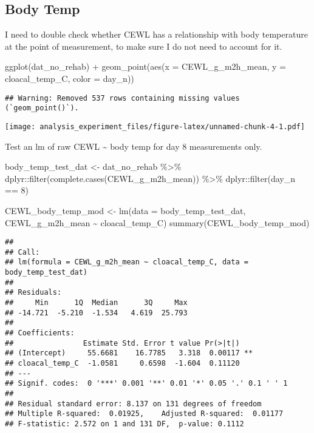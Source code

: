 \documentclass[
]{article}
\newenvironment{Shaded}{\begin{snugshade}}{\end{snugshade}}
\newcommand{\AttributeTok}[1]{\textcolor[rgb]{0.77,0.63,0.00}{#1}}
\newcommand{\DecValTok}[1]{\textcolor[rgb]{0.00,0.00,0.81}{#1}}
\newcommand{\FunctionTok}[1]{\textcolor[rgb]{0.00,0.00,0.00}{#1}}
\newcommand{\NormalTok}[1]{#1}
\newcommand{\OtherTok}[1]{\textcolor[rgb]{0.56,0.35,0.01}{#1}}
\newcommand{\SpecialCharTok}[1]{\textcolor[rgb]{0.00,0.00,0.00}{#1}}
\begin{document}
\hypertarget{body-temp}{%
\subsection{Body Temp}\label{body-temp}}

I need to double check whether CEWL has a relationship with body
temperature at the point of measurement, to make sure I do not need to
account for it.

\begin{Shaded}
\begin{Highlighting}[]
\FunctionTok{ggplot}\NormalTok{(dat\_no\_rehab) }\SpecialCharTok{+} 
  \FunctionTok{geom\_point}\NormalTok{(}\FunctionTok{aes}\NormalTok{(}\AttributeTok{x =}\NormalTok{ CEWL\_g\_m2h\_mean,}
                 \AttributeTok{y =}\NormalTok{ cloacal\_temp\_C,}
                 \AttributeTok{color =}\NormalTok{ day\_n))}
\end{Highlighting}
\end{Shaded}

\begin{verbatim}
## Warning: Removed 537 rows containing missing values (`geom_point()`).
\end{verbatim}

\texttt{[image: analysis\_experiment\_files/figure-latex/unnamed-chunk-4-1.pdf]}

Test an lm of raw CEWL \textasciitilde{} body temp for day 8
measurements only.

\begin{Shaded}
\begin{Highlighting}[]
\NormalTok{body\_temp\_test\_dat }\OtherTok{\textless{}{-}}\NormalTok{ dat\_no\_rehab }\SpecialCharTok{\%\textgreater{}\%}
\NormalTok{  dplyr}\SpecialCharTok{::}\FunctionTok{filter}\NormalTok{(}\FunctionTok{complete.cases}\NormalTok{(CEWL\_g\_m2h\_mean)) }\SpecialCharTok{\%\textgreater{}\%}
\NormalTok{  dplyr}\SpecialCharTok{::}\FunctionTok{filter}\NormalTok{(day\_n }\SpecialCharTok{==} \DecValTok{8}\NormalTok{)}

\NormalTok{CEWL\_body\_temp\_mod }\OtherTok{\textless{}{-}} \FunctionTok{lm}\NormalTok{(}\AttributeTok{data =}\NormalTok{ body\_temp\_test\_dat, }
\NormalTok{                         CEWL\_g\_m2h\_mean }\SpecialCharTok{\textasciitilde{}}\NormalTok{ cloacal\_temp\_C)}
\FunctionTok{summary}\NormalTok{(CEWL\_body\_temp\_mod)}
\end{Highlighting}
\end{Shaded}

\begin{verbatim}
## 
## Call:
## lm(formula = CEWL_g_m2h_mean ~ cloacal_temp_C, data = body_temp_test_dat)
## 
## Residuals:
##     Min      1Q  Median      3Q     Max 
## -14.721  -5.210  -1.534   4.619  25.793 
## 
## Coefficients:
##                Estimate Std. Error t value Pr(>|t|)   
## (Intercept)     55.6681    16.7785   3.318  0.00117 **
## cloacal_temp_C  -1.0581     0.6598  -1.604  0.11120   
## ---
## Signif. codes:  0 '***' 0.001 '**' 0.01 '*' 0.05 '.' 0.1 ' ' 1
## 
## Residual standard error: 8.137 on 131 degrees of freedom
## Multiple R-squared:  0.01925,    Adjusted R-squared:  0.01177 
## F-statistic: 2.572 on 1 and 131 DF,  p-value: 0.1112
\end{verbatim}
\end{document}
